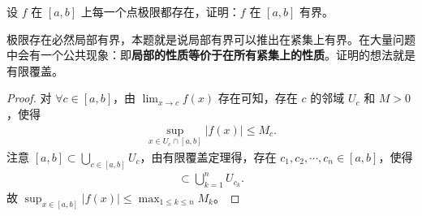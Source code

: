 \documentclass[../../main.tex]{subfiles}%
\begin{document}
\begin{example}
设 \(f\) 在 \([a,b]\) 上每一个点极限都存在，证明：\(f\) 在 \([a,b]\) 有界。
\end{example}
\begin{note}
极限存在必然局部有界，本题就是说局部有界可以推出在紧集上有界。在大量问题中会有一个公共现象：即\textbf{局部的性质等价于在所有紧集上的性质}。证明的想法就是有限覆盖。 
\end{note}
\begin{proof}
对 \(\forall c\in [a,b]\)，由 \(\lim_{x\rightarrow c}f(x)\) 存在可知，存在 \(c\) 的邻域 \(U_c\) 和 \(M>0\)，使得
\begin{align*}
\sup_{x\in U_c\cap [a,b]}|f(x)|\leqslant M_c.
\end{align*}
注意 \([a,b]\subset \bigcup_{c\in [a,b]}U_c\)，由有限覆盖定理得，存在 \(c_1,c_2,\cdots,c_n\in [a,b]\)，使得
\begin{align*}
[a,b]\subset \bigcup_{k = 1}^nU_{c_k}. 
\end{align*}
故 \(\sup_{x\in [a,b]}|f(x)|\leqslant \max_{1\leqslant k\leqslant n}M_k\)。 
\end{proof}
\end{document}
